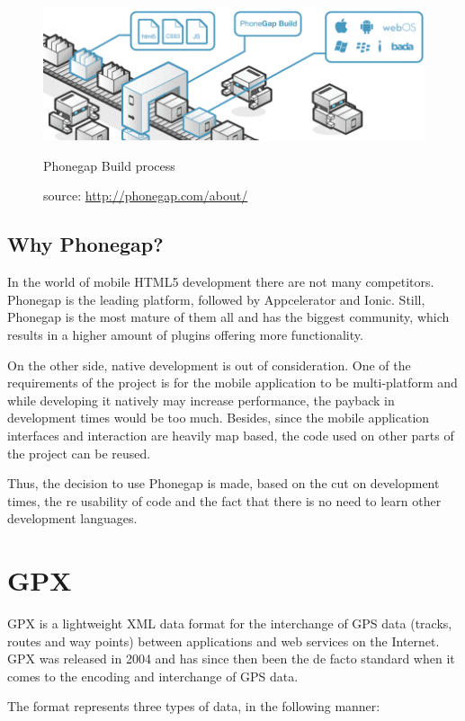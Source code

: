\begin{figure}
  \centering
  \includegraphics[width=.8\textwidth]{fig/phonegap-build}
  \caption{Phonegap Build process}
  \caption*{source: \url{http://phonegap.com/about/}}
  \label{fig:phonegapbuild}
\end{figure} 

\subsection*{Why Phonegap?}

In the world of mobile HTML5 development there are not many competitors. Phonegap is the leading platform, followed by Appcelerator and Ionic. Still, Phonegap is the most mature of them all and has the biggest community, which results in a higher amount of plugins offering more functionality.

On the other side, native development is out of consideration. One of the requirements of the project is for the mobile application to be multi-platform and while developing it natively may increase performance, the payback in development times would be too much. Besides, since the mobile application interfaces and interaction are heavily map based, the code used on other parts of the project can be reused.

Thus, the decision to use Phonegap is made, based on the cut on development times, the re usability of code and the fact that there is no need to learn other development languages.

\section{GPX}\label{gpx}

GPX is a lightweight XML data format for the interchange of GPS data (tracks, routes and way points) between applications and web services on the Internet\cite{gpx}. GPX was released in 2004 and has since then been the de facto standard when it comes to the encoding and interchange of GPS data.

The format represents three types of data, in the following manner:

